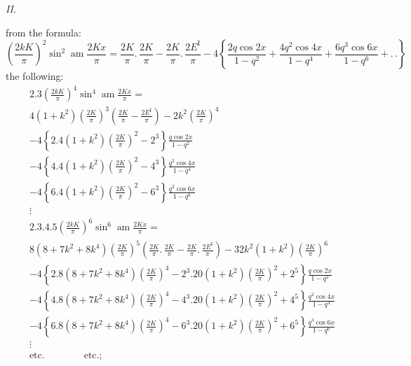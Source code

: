 \documentclass{article}
\begin{document}
\emph{II.}

from the formula:
\[
\left(\frac{2kK}{\pi}\right)^{2}\sin^{2}\operatorname{am}\frac{2Kx}{\pi}=\frac{2K}{\pi}.\,\frac{2K}{\pi}-\frac{2K}{\pi}.\,\frac{2E^{\mathrm{I}}}{\pi}-4\left\{\frac{2q\cos 2x}{1-q^{2}}+\frac{4q^{2}\cos 4x}{1-q^{4}}+\frac{6q^{3}\cos 6x}{1-q^{6}}+.\,.\right\}
\]
the following:
\[
\begin{gathered}
2.3\left(\frac{2kK}{\pi}\right)^{4}\sin^{4}\operatorname{am}\frac{2Kx}{\pi}=\\[1.5ex]
4(1+k^{2})\left(\frac{2K}{\pi}\right)^{3}\left(\frac{2K}{\pi}-\frac{2E^{\mathrm{I}}}{\pi}\right)-2k^{2}\left(\frac{2K}{\pi}\right)^{4}\\[1.5ex]
-4\left\{2.4(1+k^{2})\left(\frac{2K}{\pi}\right)^{2}-2^{3}\right\}\frac{q\cos 2x}{1-q^{2}}\\[1.5ex]
-4\left\{4.4(1+k^{2})\left(\frac{2K}{\pi}\right)^{2}-4^{3}\right\}\frac{q^{2}\cos 4x}{1-q^{4}}\\[1.5ex]
-4\left\{6.4(1+k^{2})\left(\frac{2K}{\pi}\right)^{2}-6^{3}\right\}\frac{q^{3}\cos 6x}{1-q^{6}}\\[1.5ex]
\vdots\\[1.5ex]
2.3.4.5\left(\frac{2kK}{\pi}\right)^{6}\sin^{6}\operatorname{am}\frac{2Kx}{\pi}=\\[1.5ex]
8(8+7k^{2}+8k^{4})\left(\frac{2K}{\pi}\right)^{5}\left(\frac{2K}{\pi}.\,\frac{2K}{\pi}-\frac{2K}{\pi}.\,\frac{2E^{\mathrm{I}}}{\pi}\right)-32k^{2}(1+k^{2})\left(\frac{2K}{\pi}\right)^{6}\\[1.5ex]
-4\left\{2.8(8+7k^{2}+8k^{4})\left(\frac{2K}{\pi}\right)^{4}-2^{3}.20(1+k^{2})\left(\frac{2K}{\pi}\right)^{2}+2^{5}\right\}\frac{q\cos 2x}{1-q^{2}}\\[1.5ex]
-4\left\{4.8(8+7k^{2}+8k^{4})\left(\frac{2K}{\pi}\right)^{4}-4^{3}.20(1+k^{2})\left(\frac{2K}{\pi}\right)^{2}+4^{5}\right\}\frac{q^{2}\cos 4x}{1-q^{4}}\\[1.5ex]
-4\left\{6.8(8+7k^{2}+8k^{4})\left(\frac{2K}{\pi}\right)^{4}-6^{3}.20(1+k^{2})\left(\frac{2K}{\pi}\right)^{2}+6^{5}\right\}\frac{q^{3}\cos 6x}{1-q^{6}}\\[1.5ex]
\vdots\\[1.5ex]
\text{etc.}\qquad\qquad\text{etc.};
\end{gathered}
\]
\end{document}
